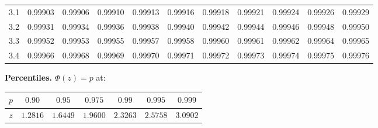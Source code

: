 \begin{center}
\begin{tabular}{c|cccccccccc}
3.1 & 0.99903 & 0.99906 & 0.99910 & 0.99913 & 0.99916 & 0.99918 & 0.99921 & 0.99924 & 0.99926 & 0.99929 \\
3.2 & 0.99931 & 0.99934 & 0.99936 & 0.99938 & 0.99940 & 0.99942 & 0.99944 & 0.99946 & 0.99948 & 0.99950 \\
3.3 & 0.99952 & 0.99953 & 0.99955 & 0.99957 & 0.99958 & 0.99960 & 0.99961 & 0.99962 & 0.99964 & 0.99965 \\
3.4 & 0.99966 & 0.99968 & 0.99969 & 0.99970 & 0.99971 & 0.99972 & 0.99973 & 0.99974 & 0.99975 & 0.99976 \\
\end{tabular}
\end{center}

\textbf{Percentiles.} $\Phi(z) = p$ at:
\begin{center}
\begin{tabular}{c|cccccc}
$p$ & $0.90$ & $0.95$ & $0.975$ & $0.99$ & $0.995$ & $0.999$ \\
\hline
$z$ & $1.2816$ & $1.6449$ & $1.9600$ & $2.3263$ & $2.5758$ & $3.0902$ \\
\end{tabular}
\end{center}

